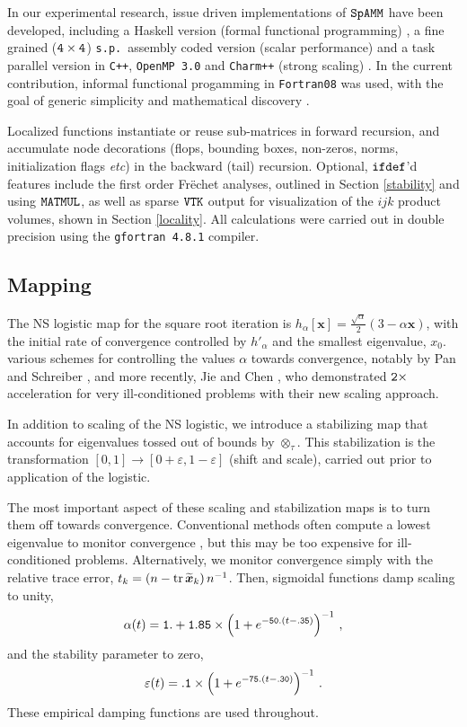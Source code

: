 \documentclass[letterpaper,twocolumn,amsmath,amsfont,amssymb,english,aps,jcp,preprintnumbers,groupaddress,nofootinbib,tightenlines,floatfix]{revtex4}
\newcommand{\mat}[1]{\boldsymbol{#1}}
\newcommand{\ot}{  {\scriptstyle \otimes}_{ \tau } }
\theoremstyle{plain}
\theoremstyle{remark}
\theoremstyle{plain}
\begin{document}
In our experimental research, issue driven implementations of $\tt SpAMM$ have been developed, 
including a Haskell version (formal functional programming) \cite{spammh}, 
a fine grained ($\tt 4\times 4$) {\tt s.p.}~assembly coded version (scalar performance) \cite{Bock2013} and  
a task parallel version in {\tt C++}, {\tt OpenMP 3.0} and {\tt Charm++} (strong scaling) \cite{BockCK14}.  
In the current  contribution, informal functional progamming in {\tt Fortran08} was used, 
with the goal of generic simplicity and mathematical discovery \cite{spammsand}.

Localized functions instantiate or reuse sub-matrices in forward recursion, and accumulate 
node decorations (flops, bounding boxes, non-zeros, norms, initialization flags {\em etc}) in 
the backward (tail) recursion.  Optional, $\tt ifdef$'d features include the first order Fr\"{e}chet 
analyses, outlined in Section \ref{stability} and using $\tt MATMUL$, 
as well as sparse $\tt VTK$ output for visualization of the $ijk$ product volumes, shown in Section \ref{locality}.
All calculations were carried out in double precision using the {\tt gfortran 4.8.1} compiler. 

\subsection{Mapping}\label{map}
The NS logistic map for the square root iteration is $h_\alpha[\mat{x}]=\frac{\sqrt{\alpha}}{2} \left(3-\alpha \mat{x} \right)$, 
with the initial rate of convergence controlled by $h'_\alpha$ and the smallest eigenvalue, $x_0$. 
various schemes for controlling the values $\alpha$ towards convergence, 
notably  by Pan and Schreiber \cite{Pan1991}, and more recently, Jie and Chen \cite{chen2014}, who demonstrated  $\tt 2 \times$
acceleration for very ill-conditioned problems with their new scaling approach. 

In addition to scaling of the NS logistic, we introduce a stabilizing map that accounts for eigenvalues 
tossed out of bounds by $\ot$. This stabilization is the transformation $[0,1] \rightarrow [0+\varepsilon, 1-\varepsilon]$
(shift and scale), carried out prior to application of the logistic.   

The most important aspect of these scaling and stabilization maps is to turn them off towards convergence.  Conventional methods 
often compute a lowest eigenvalue to monitor convergence \cite{Pan1991,chen2014}, but this may be too expensive for 
ill-conditioned problems. 
Alternatively, we monitor convergence simply with the relative trace error, 
$t_k = \left( n - {\rm tr} \, \widetilde{\mat{x}}_k \right) n^{-1}$.  
Then, sigmoidal functions damp scaling to unity,
\begin{equation}
\alpha(t) = {\tt 1.} + {\tt 1.85}  \times \left( 1+e^{-{\tt 50.}(t-{\tt .35})}  \right)^{-1}  \, ,
\end{equation}
and the stability parameter to zero,
\begin{equation}
\varepsilon(t) = {\tt .1} \times \left( 1+e^{-{\tt 75.}(t-{\tt .30})}  \right)^{-1} \, .
\end{equation}
These empirical damping functions are used throughout. 
\end{document}
